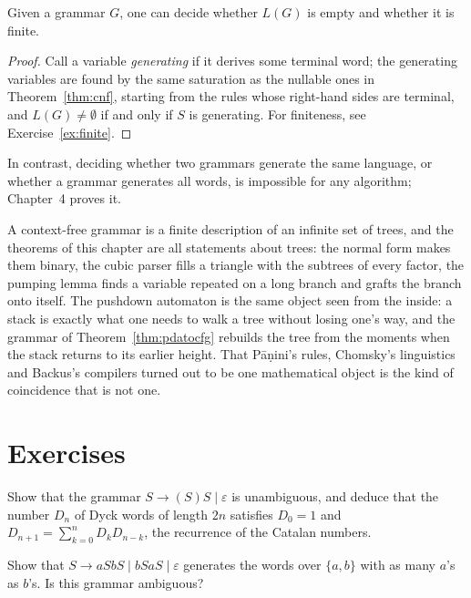 \begin{proposition}\label{prop:cfgdecide}
Given a grammar $G$, one can decide whether $L(G)$ is empty and whether it is finite.
\end{proposition}

\begin{proof}
Call a variable \emph{generating} if it derives some terminal word; the generating variables are found by the same saturation as the nullable ones in Theorem~\ref{thm:cnf}, starting from the rules whose right-hand sides are terminal, and $L(G)\ne\emptyset$ if and only if $S$ is generating. For finiteness, see Exercise~\ref{ex:finite}.
\end{proof}

In contrast, deciding whether two grammars generate the same language, or whether a grammar generates all words, is impossible for any algorithm; Chapter~4 proves it.

\begin{beauty}
A context-free grammar is a finite description of an infinite set of trees, and the theorems of this chapter are all statements about trees: the normal form makes them binary, the cubic parser fills a triangle with the subtrees of every factor, the pumping lemma finds a variable repeated on a long branch and grafts the branch onto itself. The pushdown automaton is the same object seen from the inside: a stack is exactly what one needs to walk a tree without losing one's way, and the grammar of Theorem~\ref{thm:pdatocfg} rebuilds the tree from the moments when the stack returns to its earlier height. That Pāṇini's rules, Chomsky's linguistics and Backus's compilers turned out to be one mathematical object is the kind of coincidence that is not one.
\end{beauty}

\section{Exercises}

\begin{exercise}[$\star\star$]\label{ex:dyckcount}
Show that the grammar $S\to(S)S\mid\varepsilon$ is unambiguous, and deduce that the number $D_n$ of Dyck words of length $2n$ satisfies $D_0=1$ and $D_{n+1}=\sum_{k=0}^nD_kD_{n-k}$, the recurrence of the Catalan numbers.
\end{exercise}

\begin{exercise}[$\star\star$]\label{ex:equalab}
Show that $S\to aSbS\mid bSaS\mid\varepsilon$ generates the words over $\{a,b\}$ with as many $a$'s as $b$'s. Is this grammar ambiguous?
\end{exercise}

